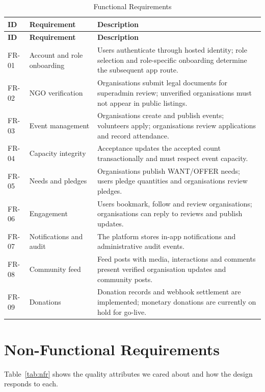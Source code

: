 \begin{longtable}{|p{}|p{}|p{}|}
\caption{Functional Requirements}\label{tab:fr}\\\hline
\textbf{ID} & \textbf{Requirement} & \textbf{Description}\\\hline
\endfirsthead
\hline
\textbf{ID} & \textbf{Requirement} & \textbf{Description}\\\hline
\endhead
FR-01 & Account and role onboarding & Users authenticate through hosted identity; role selection and role-specific onboarding determine the subsequent app route.\\\hline
FR-02 & NGO verification & Organisations submit legal documents for superadmin review; unverified organisations must not appear in public listings.\\\hline
FR-03 & Event management & Organisations create and publish events; volunteers apply; organisations review applications and record attendance.\\\hline
FR-04 & Capacity integrity & Acceptance updates the accepted count transactionally and must respect event capacity.\\\hline
FR-05 & Needs and pledges & Organisations publish WANT/OFFER needs; users pledge quantities and organisations review pledges.\\\hline
FR-06 & Engagement & Users bookmark, follow and review organisations; organisations can reply to reviews and publish updates.\\\hline
FR-07 & Notifications and audit & The platform stores in-app notifications and administrative audit events.\\\hline
FR-08 & Community feed & Feed posts with media, interactions and comments present verified organisation updates and community posts.\\\hline
FR-09 & Donations & Donation records and webhook settlement are implemented; monetary donations are currently on hold for go-live.\\\hline
\end{longtable}

\section{Non-Functional Requirements}
Table~\ref{tab:nfr} shows the quality attributes we cared about and how the design responds to each.

